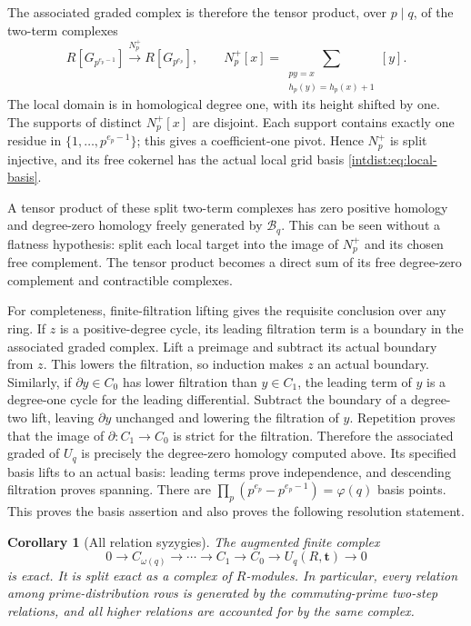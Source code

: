 \documentclass[11pt,a4paper]{article}
\numberwithin{equation}{section}
\theoremstyle{plain}
\newtheorem{corollary}[theorem]{Corollary}
\theoremstyle{definition}
\theoremstyle{remark}
\begin{document}
The associated graded complex is therefore the tensor product, over
$p\mid q$, of the two-term complexes
\begin{equation}\label{intdist:eq:local-complex}
 R[G_{p^{e_p-1}}]\xrightarrow{N_p^+}R[G_{p^{e_p}}],
 \qquad
 N_p^+[x]=
 \sum_{\substack{py=x\\h_p(y)=h_p(x)+1}}[y].
\end{equation}
The local domain is in homological degree one, with its height shifted
by one. The supports of distinct $N_p^+[x]$ are disjoint. Each support
contains exactly one residue in $\{1,\ldots,p^{e_p-1}\}$; this gives a
coefficient-one pivot. Hence $N_p^+$ is split injective, and its free
cokernel has the actual local grid basis \eqref{intdist:eq:local-basis}.

A tensor product of these split two-term complexes has zero positive
homology and degree-zero homology freely generated by
$\mathcal B_q$. This can be seen without a flatness hypothesis: split
each local target into the image of $N_p^+$ and its chosen free
complement. The tensor product becomes a direct sum of its free
degree-zero complement and contractible complexes.

For completeness, finite-filtration lifting gives the requisite
conclusion over any ring. If $z$ is a positive-degree cycle, its leading
filtration term is a boundary in the associated graded complex. Lift a
preimage and subtract its actual boundary from $z$. This lowers the
filtration, so induction makes $z$ an actual boundary. Similarly, if
$\partial y\in C_0$ has lower filtration than $y\in C_1$, the leading
term of $y$ is a degree-one cycle for the leading differential. Subtract
the boundary of a degree-two lift, leaving $\partial y$ unchanged and
lowering the filtration of $y$. Repetition proves that the image of
$\partial:C_1\to C_0$ is strict for the filtration. Therefore the
associated graded of $U_q$ is precisely the degree-zero homology
computed above. Its specified basis lifts to an actual basis: leading
terms prove independence, and descending filtration proves spanning.
There are
$\prod_p(p^{e_p}-p^{e_p-1})=\varphi(q)$ basis points. This proves the
basis assertion and also proves the following resolution statement.

\begin{corollary}[All relation syzygies]
\label{intdist:cor:resolution}
The augmented finite complex
\[
 0\longrightarrow C_{\omega(q)}\longrightarrow\cdots
 \longrightarrow C_1\longrightarrow C_0
 \longrightarrow U_q(R,\mathbf t)\longrightarrow0
\]
is exact. It is split exact as a complex of $R$-modules. In particular,
every relation among prime-distribution rows is generated by the
commuting-prime two-step relations, and all higher relations are
accounted for by the same complex.
\end{corollary}
\end{document}
